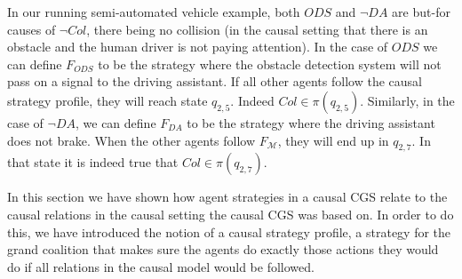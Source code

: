 \begin{example}
    In our running semi-automated vehicle example, both $ODS$ and $\neg DA$ are but-for causes of $\neg Col$, there being no collision (in the causal setting that there is an obstacle and the human driver is not paying attention). 
    In the case of $ODS$ we can define $F_{ODS}$ to be the strategy where the obstacle detection system will not pass on a signal to the driving assistant. 
    If all other agents follow the causal strategy profile, they will reach state $q_{2,5}$.
    Indeed $Col \in \pi(q_{2,5})$.
    Similarly, in the case of $\neg DA$, we can define $F_{DA}$ to be the strategy where the driving assistant does not brake. 
    When the other agents follow $F_{\mathcal{M}}$, they will end up in $q_{2,7}$.
    In that state it is indeed true that $Col \in \pi(q_{2,7})$.
\end{example}

In this section we have shown how agent strategies in a causal CGS relate to the causal relations in the causal setting the causal CGS was based on.
In order to do this, we have introduced the notion of a causal strategy profile, a strategy for the grand coalition that makes sure the agents do exactly those actions they would do if all relations in the causal model would be followed.